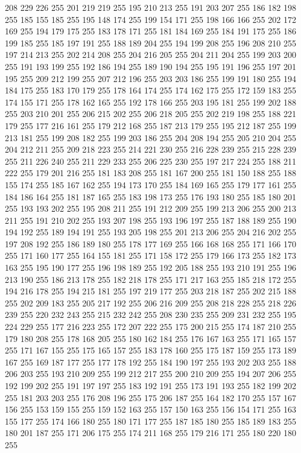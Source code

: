 208 229 226 255 201 219 219 255 195 210 213 255 191 203 207 255 186 182 198 255 185 155 185 255 195 148 174 255 199 154 171 255 198 166 166 255 202 172 169 255 194 179 175 255 183 178 171 255 181 184 169 255 184 191 175 255 186 199 185 255 185 197 191 255
188 189 204 255 194 199 208 255 196 208 210 255 197 214 213 255 202 214 208 255 204 216 205 255 204 211 204 255 199 203 200 255 191 193 199 255 192 186 194 255 189 190 194 255 195 191 196 255 197 201 195 255 209 212 199 255 207 212 196 255 203 203 186 255
199 191 180 255 194 184 175 255 183 170 179 255 178 164 174 255 174 162 175 255 172 159 183 255 174 155 171 255 178 162 165 255 192 178 166 255 203 195 181 255 199 202 188 255 203 210 201 255 206 215 202 255 206 218 205 255 202 219 198 255 188 221 179 255
177 216 161 255 179 212 168 255 187 213 179 255 195 212 187 255 199 213 181 255 199 208 182 255 199 203 186 255 204 208 194 255 205 210 204 255 204 212 211 255 209 218 223 255 214 221 230 255 216 228 239 255 215 228 239 255 211 226 240 255 211 229 233 255
206 225 230 255 197 217 224 255 188 211 222 255 179 201 216 255 181 183 208 255 181 167 200 255 181 150 188 255 188 155 174 255 185 167 162 255 194 173 170 255 184 169 165 255 179 177 161 255 184 186 164 255 181 187 165 255 183 198 173 255 176 193 180 255
185 180 201 255 193 193 202 255 195 208 211 255 191 212 209 255 199 213 206 255 200 213 211 255 191 210 202 255 193 207 198 255 193 196 197 255 187 188 189 255 190 194 192 255 189 194 191 255 193 205 198 255 201 213 206 255 204 216 202 255 197 208 192 255
186 189 180 255 178 177 169 255 166 168 168 255 171 166 170 255 171 160 177 255 164 155 181 255 171 158 172 255 179 166 173 255 182 173 163 255 195 190 177 255 196 198 189 255 192 205 188 255 193 210 191 255 196 213 190 255 186 213 178 255 182 218 178 255
171 217 163 255 185 218 172 255 194 216 178 255 194 215 181 255 197 219 177 255 203 218 187 255 202 215 188 255 202 209 183 255 205 217 192 255 206 216 209 255 208 218 228 255 218 226 239 255 220 232 243 255 215 232 242 255 208 230 235 255 209 231 232 255
195 224 229 255 177 216 223 255 172 207 222 255 175 200 215 255 174 187 210 255 179 180 208 255 178 168 205 255 180 162 184 255 176 167 163 255 171 165 157 255 171 167 155 255 175 165 157 255 183 178 160 255 175 187 159 255 173 189 167 255 169 187 177 255
177 178 192 255 184 190 197 255 193 202 203 255 188 206 203 255 193 210 209 255 199 212 217 255 200 210 209 255 194 207 206 255 192 199 202 255 191 197 197 255 183 192 191 255 173 191 193 255 182 199 202 255 181 203 203 255 176 208 196 255 175 206 187 255
164 182 170 255 157 167 156 255 153 159 155 255 159 152 163 255 157 150 163 255 156 154 171 255 163 155 177 255 174 166 180 255 180 171 177 255 187 185 180 255 185 189 183 255 180 201 187 255 171 206 175 255 174 211 168 255 179 216 171 255 180 220 180 255
